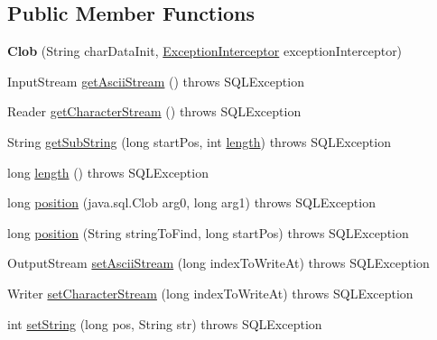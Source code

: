 \subsection*{Public Member Functions}
\begin{DoxyCompactItemize}
\item 
\mbox{\label{classcom_1_1mysql_1_1cj_1_1jdbc_1_1_clob_a782b5a3df742e495e2b59d7b9b5abdc4}} 
{\bfseries Clob} (String char\+Data\+Init, \mbox{\hyperlink{interfacecom_1_1mysql_1_1cj_1_1exceptions_1_1_exception_interceptor}{Exception\+Interceptor}} exception\+Interceptor)
\item 
Input\+Stream \mbox{\hyperlink{classcom_1_1mysql_1_1cj_1_1jdbc_1_1_clob_a207902fd33eb4765d5b102a6512a14fe}{get\+Ascii\+Stream}} ()  throws S\+Q\+L\+Exception 
\item 
Reader \mbox{\hyperlink{classcom_1_1mysql_1_1cj_1_1jdbc_1_1_clob_a2257c466b89e944490f677dfdfc3dbe4}{get\+Character\+Stream}} ()  throws S\+Q\+L\+Exception 
\item 
String \mbox{\hyperlink{classcom_1_1mysql_1_1cj_1_1jdbc_1_1_clob_a6329527c580f97eb9ad48187443b2134}{get\+Sub\+String}} (long start\+Pos, int \mbox{\hyperlink{classcom_1_1mysql_1_1cj_1_1jdbc_1_1_clob_a34d1c1c51a7cab4cb589c6743f78f3d1}{length}})  throws S\+Q\+L\+Exception 
\item 
long \mbox{\hyperlink{classcom_1_1mysql_1_1cj_1_1jdbc_1_1_clob_a34d1c1c51a7cab4cb589c6743f78f3d1}{length}} ()  throws S\+Q\+L\+Exception 
\item 
long \mbox{\hyperlink{classcom_1_1mysql_1_1cj_1_1jdbc_1_1_clob_a94dca4c47b990167d6ab98c87ae43ce4}{position}} (java.\+sql.\+Clob arg0, long arg1)  throws S\+Q\+L\+Exception 
\item 
long \mbox{\hyperlink{classcom_1_1mysql_1_1cj_1_1jdbc_1_1_clob_a294c4cca4be72b8d7f87b97f95d59e54}{position}} (String string\+To\+Find, long start\+Pos)  throws S\+Q\+L\+Exception 
\item 
Output\+Stream \mbox{\hyperlink{classcom_1_1mysql_1_1cj_1_1jdbc_1_1_clob_a689233129f0a3ee09fdb60020a826b59}{set\+Ascii\+Stream}} (long index\+To\+Write\+At)  throws S\+Q\+L\+Exception 
\item 
Writer \mbox{\hyperlink{classcom_1_1mysql_1_1cj_1_1jdbc_1_1_clob_aa21bc09d5e81110704dd1c2c7fad6f75}{set\+Character\+Stream}} (long index\+To\+Write\+At)  throws S\+Q\+L\+Exception 
\item 
int \mbox{\hyperlink{classcom_1_1mysql_1_1cj_1_1jdbc_1_1_clob_a16363c80864ce2bcbee073698856df78}{set\+String}} (long pos, String str)  throws S\+Q\+L\+Exception 

\end{DoxyCompactItemize}
